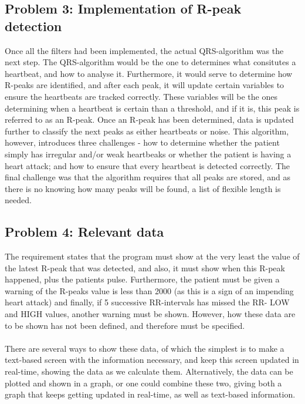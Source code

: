 \documentclass[12pt,a4paper]{article}
\begin{document}
\subsection{Problem 3: Implementation of R-peak detection}
	Once all the filters had been implemented, the actual QRS-algorithm was the next step. The QRS-algorithm would be the one to determines what consitutes a heartbeat, and how to analyse it. Furthermore, it would serve to determine how R-peaks are identified, and after each peak, it will update certain variables to ensure the heartbeats are tracked correctly. These variables will be the ones determining when a heartbeat is certain than a threshold, and if it is, this peak is referred to as an R-peak. Once an R-peak has been determined, data is updated further to classify the next peaks as either heartbeats or noise. This algorithm, however, introduces three challenges - how to determine whether the patient simply has irregular and/or weak heartbeaks or whether the patient is having a heart attack; and how to ensure that every heartbeat is detected correctly. The final challenge was that the algorithm requires that all peaks are stored, and as there is no knowing how many peaks will be found, a list of flexible length is needed.\\

\subsection{Problem 4: Relevant data}
	The requirement states that the program must show at the very least the value of the latest R-peak that was detected, and also, it must show when this R-peak happened, plus the patients pulse. Furthermore, the patient must be given a warning of the R-peaks value is less than 2000 (as this is a sign of an impending heart attack) and finally, if 5 successive RR-intervals has missed the RR- LOW and HIGH values, another warning must be shown. However, how these data are to be shown has not been defined, and therefore must be specified.\\
	\\
	There are several ways to show these data, of which the simplest is to make a text-based screen with the information necessary, and keep this screen updated in real-time, showing the data as we calculate them. Alternatively, the data can be plotted and shown in a graph, or one could combine these two, giving both a graph that keeps getting updated in real-time, as well as text-based information.\\
\end{document}
